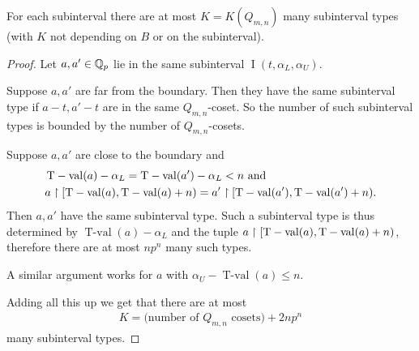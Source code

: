 \documentclass{amsart}
\DeclareMathOperator{\tval}{T-val}
\DeclareMathOperator{\inti}{I}
\newcommand{\interval}{\inti(t, \alpha_L, \alpha_U)}
\begin{document}
\begin{Lemma} \label{interval_type_count}
  For each subinterval there are at most $K = K(Q_{m,n})$ many subinterval types 
  (with $K$ not depending on $B$ or on the subinterval).  
\end{Lemma}

\begin{proof}
  Let $a, a' \in \mathbb{Q}_p$ lie in the same subinterval $\interval$.

  Suppose $a, a'$ are far from the boundary.
  Then they have the same subinterval type if $a - t, a' - t$ are in the same $Q_{m,n}$-coset.
  So the number of such subinterval types is bounded by the number of $Q_{m,n}$-cosets.

  Suppose $a, a'$ are close to the boundary and
  \begin{align*}
    &\tval(a) - \alpha_L = \tval(a') - \alpha_L < n \text { and}\\
    &a \midr [\tval(a), \tval(a) + n) = a' \midr [\tval(a'), \tval(a') + n).
  \end{align*}
  Then $a, a'$ have the same subinterval type.
  Such a subinterval type is thus determined by $\tval(a) - \alpha_L$ and the tuple $a \midr [\tval(a), \tval(a) + n)$,
  therefore there are at most $n p^n$ many such types.

  A similar argument works for $a$ with $\alpha_U - \tval(a) \leq n$.

  Adding all this up we get that there are at most
  \begin{align*}
    K = \text{(number of $Q_{m,n}$ cosets)} + 2 n p^n  
  \end{align*}
  many subinterval types.
\end{proof}
\end{document}
